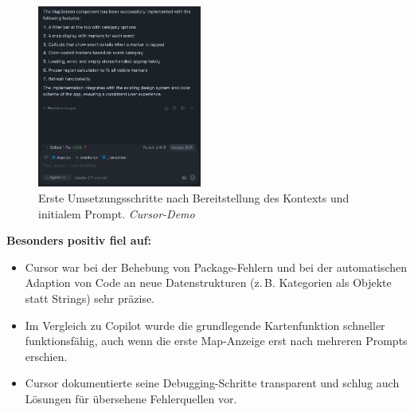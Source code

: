\begin{figure}[htbp]
      \centering
      \includegraphics[width=0.48\textwidth]{images/cursor_screenshots/erster durchgang-cursor.png}
      \caption{Erste Umsetzungsschritte nach Bereitstellung des Kontexts und initialem Prompt. \textit{Cursor-Demo}}
      \label{fig:cursor-erster-durchgang}
\end{figure}

\textbf{Besonders positiv fiel auf:}
\begin{itemize}
      \item Cursor war bei der Behebung von Package-Fehlern und bei der automatischen
            Adaption von Code an neue Datenstrukturen (z.\,B. Kategorien als Objekte statt
            Strings) sehr präzise.
      \item Im Vergleich zu Copilot wurde die grundlegende Kartenfunktion schneller
            funktionsfähig, auch wenn die erste Map-Anzeige erst nach mehreren Prompts
            erschien.
      \item Cursor dokumentierte seine Debugging-Schritte transparent und schlug auch
            Lösungen für übersehene Fehlerquellen vor.
\end{itemize}

